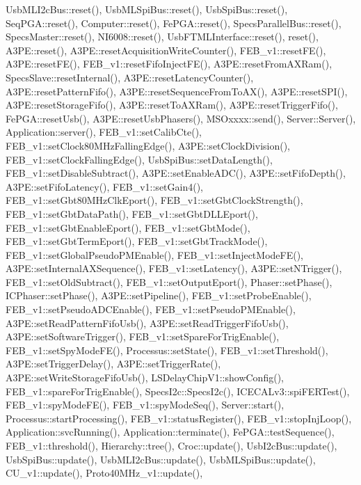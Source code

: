 Usb\+M\+L\+I2c\+Bus\+::reset(), Usb\+M\+L\+Spi\+Bus\+::reset(), Usb\+Spi\+Bus\+::reset(), Seq\+P\+G\+A\+::reset(), Computer\+::reset(), Fe\+P\+G\+A\+::reset(), Specs\+Parallel\+Bus\+::reset(), Specs\+Master\+::reset(), N\+I6008\+::reset(), Usb\+F\+T\+M\+L\+Interface\+::reset(), reset(), A3\+P\+E\+::reset(), A3\+P\+E\+::reset\+Acquisition\+Write\+Counter(), F\+E\+B\+\_\+v1\+::reset\+F\+E(), A3\+P\+E\+::reset\+F\+E(), F\+E\+B\+\_\+v1\+::reset\+Fifo\+Inject\+F\+E(), A3\+P\+E\+::reset\+From\+A\+X\+Ram(), Specs\+Slave\+::reset\+Internal(), A3\+P\+E\+::reset\+Latency\+Counter(), A3\+P\+E\+::reset\+Pattern\+Fifo(), A3\+P\+E\+::reset\+Sequence\+From\+To\+A\+X(), A3\+P\+E\+::reset\+S\+P\+I(), A3\+P\+E\+::reset\+Storage\+Fifo(), A3\+P\+E\+::reset\+To\+A\+X\+Ram(), A3\+P\+E\+::reset\+Trigger\+Fifo(), Fe\+P\+G\+A\+::reset\+Usb(), A3\+P\+E\+::reset\+Usb\+Phasers(), M\+S\+Oxxxx\+::send(), Server\+::\+Server(), Application\+::server(), F\+E\+B\+\_\+v1\+::set\+Calib\+Cte(), F\+E\+B\+\_\+v1\+::set\+Clock80\+M\+Hz\+Falling\+Edge(), A3\+P\+E\+::set\+Clock\+Division(), F\+E\+B\+\_\+v1\+::set\+Clock\+Falling\+Edge(), Usb\+Spi\+Bus\+::set\+Data\+Length(), F\+E\+B\+\_\+v1\+::set\+Disable\+Subtract(), A3\+P\+E\+::set\+Enable\+A\+D\+C(), A3\+P\+E\+::set\+Fifo\+Depth(), A3\+P\+E\+::set\+Fifo\+Latency(), F\+E\+B\+\_\+v1\+::set\+Gain4(), F\+E\+B\+\_\+v1\+::set\+Gbt80\+M\+Hz\+Clk\+Eport(), F\+E\+B\+\_\+v1\+::set\+Gbt\+Clock\+Strength(), F\+E\+B\+\_\+v1\+::set\+Gbt\+Data\+Path(), F\+E\+B\+\_\+v1\+::set\+Gbt\+D\+L\+L\+Eport(), F\+E\+B\+\_\+v1\+::set\+Gbt\+Enable\+Eport(), F\+E\+B\+\_\+v1\+::set\+Gbt\+Mode(), F\+E\+B\+\_\+v1\+::set\+Gbt\+Term\+Eport(), F\+E\+B\+\_\+v1\+::set\+Gbt\+Track\+Mode(), F\+E\+B\+\_\+v1\+::set\+Global\+Pseudo\+P\+M\+Enable(), F\+E\+B\+\_\+v1\+::set\+Inject\+Mode\+F\+E(), A3\+P\+E\+::set\+Internal\+A\+X\+Sequence(), F\+E\+B\+\_\+v1\+::set\+Latency(), A3\+P\+E\+::set\+N\+Trigger(), F\+E\+B\+\_\+v1\+::set\+Old\+Subtract(), F\+E\+B\+\_\+v1\+::set\+Output\+Eport(), Phaser\+::set\+Phase(), I\+C\+Phaser\+::set\+Phase(), A3\+P\+E\+::set\+Pipeline(), F\+E\+B\+\_\+v1\+::set\+Probe\+Enable(), F\+E\+B\+\_\+v1\+::set\+Pseudo\+A\+D\+C\+Enable(), F\+E\+B\+\_\+v1\+::set\+Pseudo\+P\+M\+Enable(), A3\+P\+E\+::set\+Read\+Pattern\+Fifo\+Usb(), A3\+P\+E\+::set\+Read\+Trigger\+Fifo\+Usb(), A3\+P\+E\+::set\+Software\+Trigger(), F\+E\+B\+\_\+v1\+::set\+Spare\+For\+Trig\+Enable(), F\+E\+B\+\_\+v1\+::set\+Spy\+Mode\+F\+E(), Processus\+::set\+State(), F\+E\+B\+\_\+v1\+::set\+Threshold(), A3\+P\+E\+::set\+Trigger\+Delay(), A3\+P\+E\+::set\+Trigger\+Rate(), A3\+P\+E\+::set\+Write\+Storage\+Fifo\+Usb(), L\+S\+Delay\+Chip\+V1\+::show\+Config(), F\+E\+B\+\_\+v1\+::spare\+For\+Trig\+Enable(), Specs\+I2c\+::\+Specs\+I2c(), I\+C\+E\+C\+A\+Lv3\+::spi\+F\+E\+R\+Test(), F\+E\+B\+\_\+v1\+::spy\+Mode\+F\+E(), F\+E\+B\+\_\+v1\+::spy\+Mode\+Seq(), Server\+::start(), Processus\+::start\+Processing(), F\+E\+B\+\_\+v1\+::status\+Register(), F\+E\+B\+\_\+v1\+::stop\+Inj\+Loop(), Application\+::svc\+Running(), Application\+::terminate(), Fe\+P\+G\+A\+::test\+Sequence(), F\+E\+B\+\_\+v1\+::threshold(), Hierarchy\+::tree(), Croc\+::update(), Usb\+I2c\+Bus\+::update(), Usb\+Spi\+Bus\+::update(), Usb\+M\+L\+I2c\+Bus\+::update(), Usb\+M\+L\+Spi\+Bus\+::update(), C\+U\+\_\+v1\+::update(), Proto40\+M\+Hz\+\_\+v1\+::update(), 